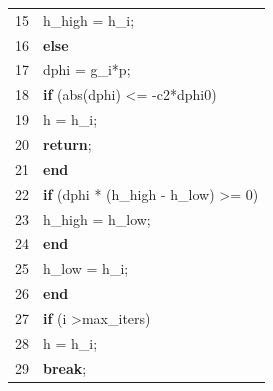 \documentclass[bosnian,12pt,a4paper]{report}
\begin{document}
\begin{tabular}{ll}
15 & \hspace*{3cm}h_high = h\_i;                                                                  \\
16 & \hspace*{2cm}\textbf{else                                                                      } \\
17 & \hspace*{3cm}dphi = g\_i*p;                                                             \\
18 & \hspace*{3cm}\textbf{if} (abs(dphi) \textless{}= -c2*dphi0)                                      \\
19 & \hspace*{4cm}h = h\_i;                                                                  \\
20 & \hspace*{4cm}\textbf{return};                                                                     \\
21 & \hspace*{3cm}\textbf{end                                                                       } \\
22 & \hspace*{3cm}\textbf{if} (dphi *  (h\_high - h\_low) \textgreater{}= 0)                             \\
23 & \hspace*{4cm}h\_high = h\_low;                                                             \\
24 & \hspace*{3cm}\textbf{end                                                                       } \\
25 & \hspace*{3cm}h\_low = h\_i;                                                              \\
26 & \hspace*{2cm}\textbf{end                                                                       } \\
27 & \hspace*{2cm}\textbf{if} (i \textgreater max\_iters)                                             \\
28 & \hspace*{3cm}h = h\_i;                                                                  \\
29 & \hspace*{3cm}\textbf{break};                                                                     \\

\end{tabular}
\end{document}
